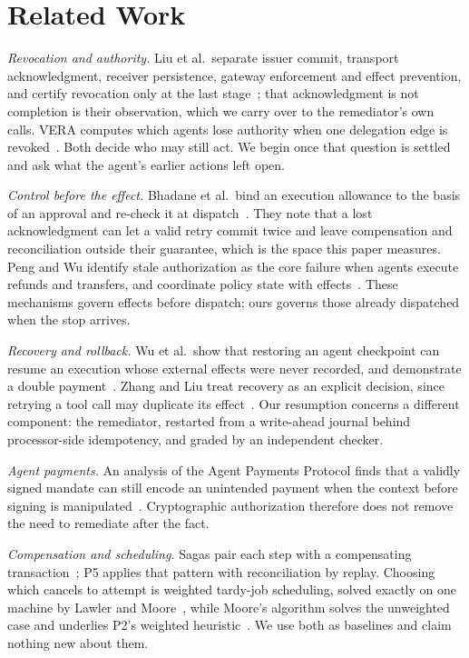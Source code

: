 \section{Related Work}\label{sec:related}

\emph{Revocation and authority.} Liu et al.\ separate issuer commit, transport acknowledgment, receiver persistence, gateway enforcement and effect prevention, and certify revocation only at the last stage~\cite{liu2026revocation}; that acknowledgment is not completion is their observation, which we carry over to the remediator's own calls. VERA computes which agents lose authority when one delegation edge is revoked~\cite{liu2026vera}. Both decide who may still act. We begin once that question is settled and ask what the agent's earlier actions left open.

\emph{Control before the effect.} Bhadane et al.\ bind an execution allowance to the basis of an approval and re-check it at dispatch~\cite{bhadane2026runtime}. They note that a lost acknowledgment can let a valid retry commit twice and leave compensation and reconciliation outside their guarantee, which is the space this paper measures. Peng and Wu identify stale authorization as the core failure when agents execute refunds and transfers, and coordinate policy state with effects~\cite{peng2026stateful}. These mechanisms govern effects before dispatch; ours governs those already dispatched when the stop arrives.

\emph{Recovery and rollback.} Wu et al.\ show that restoring an agent checkpoint can resume an execution whose external effects were never recorded, and demonstrate a double payment~\cite{wu2026safe}. Zhang and Liu treat recovery as an explicit decision, since retrying a tool call may duplicate its effect~\cite{zhang2026recoverability}. Our resumption concerns a different component: the remediator, restarted from a write-ahead journal behind processor-side idempotency, and graded by an independent checker.

\emph{Agent payments.} An analysis of the Agent Payments Protocol finds that a validly signed mandate can still encode an unintended payment when the context before signing is manipulated~\cite{aviv2026ap2}. Cryptographic authorization therefore does not remove the need to remediate after the fact.

\emph{Compensation and scheduling.} Sagas pair each step with a compensating transaction~\cite{garciamolina1987sagas}; P5 applies that pattern with reconciliation by replay. Choosing which cancels to attempt is weighted tardy-job scheduling, solved exactly on one machine by Lawler and Moore~\cite{lawler1969functional}, while Moore's algorithm solves the unweighted case and underlies P2's weighted heuristic~\cite{moore1968njob}. We use both as baselines and claim nothing new about them.
